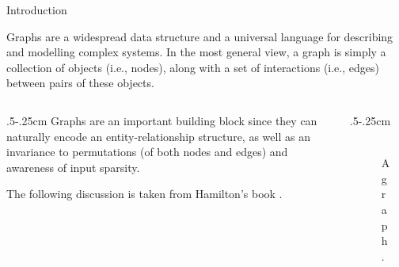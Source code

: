 \documentclass[10pt, aspectratio=169, compress, protectframetitle, handout]{beamer}
\begin{document}
\begin{frame}{Introduction}
    
    Graphs are a widespread data structure and a universal language for describing and modelling complex systems. In the most general view, a graph is simply a collection of objects (i.e., nodes), along with a set of interactions (i.e., edges) between pairs of these objects. 
    \bigskip
    
    \begin{columns}[onlytextwidth]
        \begin{column}{.5\textwidth-.25cm}
            Graphs are an important building block since they can naturally encode an \alert{entity-relationship structure}, as well as an \alert{invariance to permutations} (of both nodes and edges) and awareness of \alert{input sparsity}.
            \bigskip
            
            The following discussion is taken from Hamilton's book \cite{HamiltonGRLBook}.
        \end{column}
        \begin{column}{.5\textwidth-.25cm}
            \begin{figure}
                \centering
                \includegraphics[width=3.8cm]{figures/Graph}
                \caption{A graph.}
            \end{figure}
        \end{column}
    \end{columns}
    
\end{frame}
\end{document}
